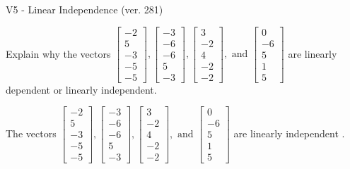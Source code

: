 \begin{exercise}
  \begin{exerciseTitle}V5 - Linear Independence (ver. 281)\end{exerciseTitle}
  \begin{exerciseStatement}
    Explain why the vectors \(\left[\begin{array}{r}
-2 \\
5 \\
-3 \\
-5 \\
-5
\end{array}\right] , \left[\begin{array}{r}
-3 \\
-6 \\
-6 \\
5 \\
-3
\end{array}\right] , \left[\begin{array}{r}
3 \\
-2 \\
4 \\
-2 \\
-2
\end{array}\right] , \text{ and } \left[\begin{array}{r}
0 \\
-6 \\
5 \\
1 \\
5
\end{array}\right]\) are linearly dependent or linearly independent.	


  \end{exerciseStatement}
  \begin{exerciseAnswer}
   The vectors \(\left[\begin{array}{r}
-2 \\
5 \\
-3 \\
-5 \\
-5
\end{array}\right] , \left[\begin{array}{r}
-3 \\
-6 \\
-6 \\
5 \\
-3
\end{array}\right] , \left[\begin{array}{r}
3 \\
-2 \\
4 \\
-2 \\
-2
\end{array}\right] , \text{ and } \left[\begin{array}{r}
0 \\
-6 \\
5 \\
1 \\
5
\end{array}\right]\) are 
  	 linearly independent  .
  


  \end{exerciseAnswer}
\end{exercise}